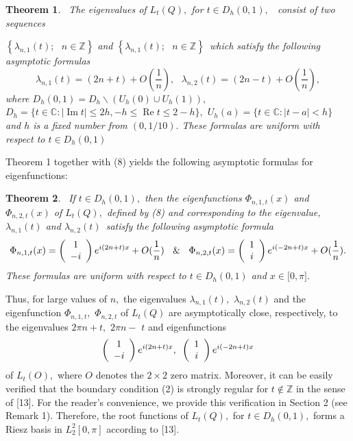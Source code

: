 \documentclass{article}%
\newtheorem{theorem}{Theorem}
{}
\begin{document}
\begin{theorem}
\textit{\ The eigenvalues of }$L_{t}(Q),$ for $t\in D_{h}(0,1),$%
\textit{\ consist of two sequences }

$\left\{  \lambda_{n,1}(t);\text{ }n\in\mathbb{Z}\right\}  $ and $\left\{
\lambda_{n,1}(t);\text{ }n\in\mathbb{Z}\right\}  $\ which satisfy the
following asymptotic formulas%
\begin{equation}
\lambda_{n,1}(t)=(2n+t)+O(\frac{1}{n}),\text{ }\lambda_{n,2}(t)=(2n-t)+O(\frac
{1}{n}), \tag{10}%
\end{equation}
where $D_{h}(0,1)=D_{h}\backslash\left(  U_{h}(0)\cup U_{h}(1)\right)  ,$
$D_{h}=\{t\in\mathbb{C}:|\operatorname{Im}t|\leq2h,-h\leq\operatorname{Re}%
t\leq2-h\},$ $U_{h}(a)=\{t\in\mathbb{C}:|t-a|<h\}$ and $h$ is a fixed number
from $(0,1/10).$ These formulas are uniform with respect to $t\in D_{h}(0,1)$
\end{theorem}

Theorem 1 together with (8) yields the following asymptotic formulas for eigenfunctions:

\begin{theorem}
\textit{\ If }$t\in D_{h}(0,1),$ then the\textit{ }eigenfunctions
$\Phi_{n,1,t}(x)$ and $\Phi_{n,2,t}(x)$ of $L_{t}(Q),$ defined by (8) and
corresponding to the eigenvalue, $\lambda_{n,1}(t)$ and $\lambda_{n,2}%
(t)$\ \textit{satisfy} the following asymptotic formula%
\[
\Phi_{n,1,t}(x)=\left(
\begin{array}
[c]{c}%
1\\
-i
\end{array}
\right)  e^{i(2n+t)x}+O(\frac{1}{n})\text{ }\And\text{ }\Phi_{n,2,t}%
(x)=\left(
\begin{array}
[c]{c}%
1\\
i
\end{array}
\right)  e^{i(-2n+t)x}+O(\frac{1}{n}).
\]
These formulas are uniform with respect to $t\in D_{h}(0,1)$ and $x\in
\lbrack0,\pi].$
\end{theorem}

Thus, for large values of $n,$ the eigenvalues $\lambda_{n,1}(t),$
$\lambda_{n,2}(t)$ and the eigenfunction $\Phi_{n,1,t},$ $\Phi_{n,2,t}$ of
$L_{t}(Q)$ are asymptotically close, respectively, to the eigenvalues $2\pi
n+t,$ $2\pi n-$ $t$ and eigenfunctions
\[
\left(
\begin{array}
[c]{c}%
1\\
-i
\end{array}
\right)  e^{i(2n+t)x},\text{ }\left(
\begin{array}
[c]{c}%
1\\
i
\end{array}
\right)  e^{i(-2n+t)x}%
\]
of $L_{t}(O),$ where $O$ denotes the $2\times2$ zero matrix. Moreover, it can
be easily verified that the boundary condition (2) is strongly regular for
$t\notin\mathbb{Z}$ in the sense of [13]. For the reader's convenience, we
provide this verification in Section 2 (see Remark 1). Therefore, the root
functions of $L_{t}(Q),$ for $t\in D_{h}(0,1),$ forms a Riesz basis in
$L_{2}^{2}[0,\pi]$ according to [13].
\end{document}
